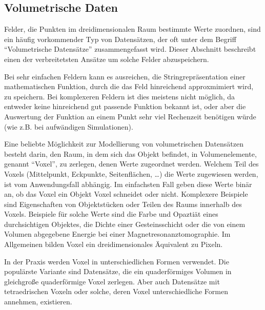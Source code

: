 \documentclass[a4paper,fontsize=12pt,toc=bib,halfparskip]{scrartcl}
\begin{document}
\subsection{Volumetrische Daten}
Felder, die Punkten im dreidimensionalen Raum bestimmte Werte zuordnen, sind ein h\"aufig vorkommender Typ von Datens\"atzen, der oft unter dem Begriff ``Volumetrische Datens\"atze'' zusammengefasst wird. Dieser Abschnitt beschreibt einen der verbreitetsten Ans\"atze um solche Felder abzuspeichern.  

Bei sehr einfachen Feldern kann es ausreichen, die Stringrepr\"asentation einer mathematischen Funktion, durch die das Feld hinreichend approxmimiert wird, zu speichern. Bei komplexeren Feldern ist dies meistens nicht m\"oglich, da entweder keine hinreichend gut passende Funktion bekannt ist, oder aber die Auswertung der Funktion an einem Punkt sehr viel Rechenzeit ben\"otigen w\"urde (wie z.B. bei aufw\"andigen Simulationen). 

Eine beliebte M\"oglichkeit zur Modellierung von volumetrischen Datens\"atzen besteht darin, den Raum, in dem sich das Objekt befindet, in Volumenelemente, genannt ``Voxel'', zu zerlegen, denen Werte zugeordnet werden. Welchem Teil des Voxels (Mittelpunkt, Eckpunkte, Seitenfl\"achen, \dots) die Werte zugewiesen werden, ist vom Anwendungsfall abh\"angig. Im einfachsten Fall geben diese Werte bin\"ar an, ob das Voxel ein Objekt Voxel schneidet oder nicht. Komplexere Beispiele sind Eigenschaften von Objektst\"ucken oder Teilen des Raums innerhalb des Voxels. Beispiele f\"ur solche Werte sind die Farbe und Opazti\"at eines durchsichtigen Objektes, die Dichte einer Gesteinsschicht oder die von einem Volumen abgegebene Energie bei einer Magnetresonanztomographie. Im Allgemeinen bilden Voxel ein dreidimensionales \"Aquivalent zu Pixeln.

In der Praxis werden Voxel in unterschiedlichen Formen verwendet. Die popul\"arste Variante sind Datens\"atze, die ein quaderf\"ormiges Volumen in gleichgro{\ss}e quaderf\"ormige Voxel zerlegen. Aber auch Datens\"atze mit tetraedrischen Voxeln oder solche, deren Voxel unterschiedliche Formen annehmen, existieren. 
\end{document}
